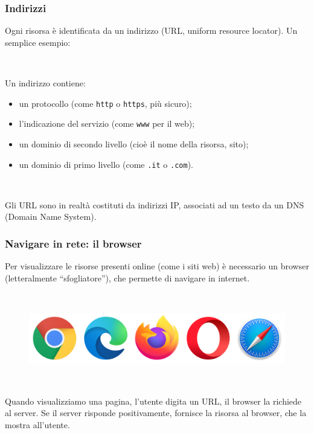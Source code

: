 \documentclass[]{beamer}
\begin{document}
\begin{frame}
\frametitle{Indirizzi}
Ogni risorsa è identificata da un \alert<1>{indirizzo} (URL, uniform resource locator). Un semplice esempio:\pause

\begin{center}
\end{center}

~

Un indirizzo contiene:
\begin{itemize}
  \item un \alert<2>{protocollo} (come \texttt{http} o \texttt{https}, più sicuro);\pause
  \item l'indicazione del \alert<3>{servizio} (come \texttt{www} per il web);\pause
  \item un \alert<4>{dominio di secondo livello} (cioè il nome della risorsa, sito);\pause
  \item un \alert<5>{dominio di primo livello} (come \texttt{.it} o \texttt{.com}).\pause
\end{itemize}

~

Gli URL sono in realtà costituti da indirizzi IP, associati ad un testo da un DNS (Domain Name System).
\end{frame}


\begin{frame}
\frametitle{Navigare in rete: il browser}
Per visualizzare le risorse presenti online (come i siti web) è necessario un \alert<1>{browser} (letteralmente ``sfogliatore''), che permette di \alert<1>{navigare in internet}.

~

\begin{figure}
  \includegraphics[width=.7\columnwidth]{img/browsers.png}
\end{figure}\pause

~

Quando visualizziamo una pagina, l'utente digita un URL, il browser la richiede al server. Se il server risponde positivamente, fornisce la risorsa al browser, che la mostra all'utente.
\end{frame}
\end{document}
